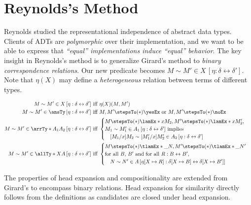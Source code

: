 \documentclass{article}
\newcommand{\rsim}[6]{#1 \sim #2 \in #3 \, [#4 : #5 \leftrightarrow #6]}
\begin{document}
\section{Reynolds's Method}
Reynolds studied the representational independence of abstract data types. Clients of ADTs are \emph{polymorphic} over their implementation, and we want to be able to express that \emph{``equal'' implementations induce ``equal'' behavior}. The key insight in Reynolds's method is to generalize Girard's method to \emph{binary correspondence relations}. Our new predicate becomes $\rsim{M}{M'}{X}{\eta}{\delta}{\delta'}$. Note that $\eta(X)$ may define a \emph{heterogeneous} relation between terms of different types.

\begin{definition}[Similarity]
    \begin{align*}
        \rsim{M}{M'}{X}{\eta}{\delta}{\delta'} &\text{ iff } \eta(X)(M, M') \\
        \rsim{M}{M'}{\ansTy}{\eta}{\delta}{\delta'} &\text{ iff } M, M'\stepsTo(\ast) \yesEx \text{ or } M, M'\stepsTo(\ast) \noEx \\
        \rsim{M}{M'}{\arrTy*{A_1}{A_2}}{\eta}{\delta}{\delta'} &\text{ iff } \begin{cases}
            M \stepsTo(\ast) \lamEx*{x}{M_2}, M' \stepsTo(\ast) \lamEx*{x}{M_2'}, \\
            \rsim{M_1}{M_1'}{A_1}{\eta}{\delta}{\delta'} \text{ implies } \\ 
            \quad\rsim{[M_1/x]M_2}{[M_1'/x]M_2'}{A_2}{\eta}{\delta}{\delta'}
        \end{cases} \\
        \rsim{M}{M'}{\allTy*{X}{A}}{\eta}{\delta}{\delta'} &\text{ iff } \begin{cases}
            M\stepsTo({\ast}) \tlamEx*{\_}{N}, M' \stepsTo({\ast}) \tlamEx*{\_}{N'} \\
            \text{for all $B$, $B'$ and for all $R:B\leftrightarrow B'$}, \\
            \quad\rsim{N}{N'}{A}{\eta[X\mapsto R]}{\delta[X\mapsto B]}{\delta[X\mapsto B']}
        \end{cases}
    \end{align*}
\end{definition}

The properties of head expansion and compositionality are extended from Girard's to encompass binary relations. Head expansion for similarity directly follows from the definitions as candidates are closed under head expansion.
\end{document}
